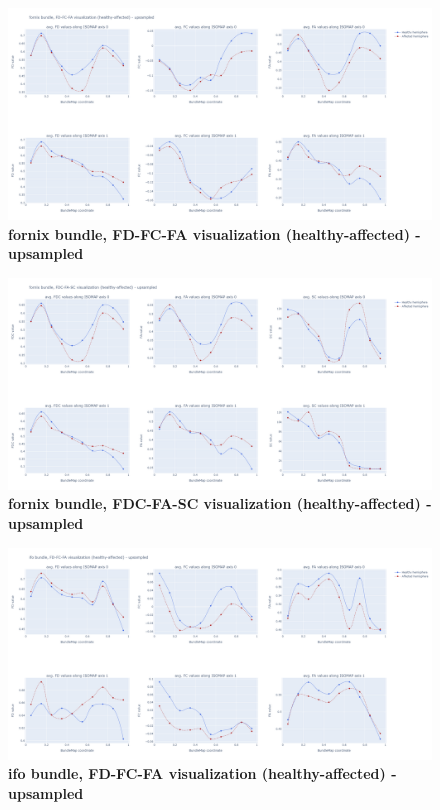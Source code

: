 \documentclass[thesis.tex]{subfiles}
\begin{document}
\begin{figure}
  \centering
  \includegraphics[width=24cm]{thesis_radomskyi/apendix/fornix bundle, FD-FC-FA visualization (healthy-affected) - upsampled.png}
    \caption{\textbf{fornix bundle, FD-FC-FA visualization (healthy-affected) - upsampled}}
\end{figure}

\begin{figure}
  \centering
  \includegraphics[width=24cm]{thesis_radomskyi/apendix/fornix bundle, FDC-FA-SC visualization (healthy-affected) - upsampled.png}
    \caption{\textbf{fornix bundle, FDC-FA-SC visualization (healthy-affected) - upsampled}}
\end{figure}

\begin{figure}
  \centering
  \includegraphics[width=24cm]{thesis_radomskyi/apendix/ifo bundle, FD-FC-FA visualization (healthy-affected) - upsampled.png}
    \caption{\textbf{ifo bundle, FD-FC-FA visualization (healthy-affected) - upsampled}}
\end{figure}
\end{document}
